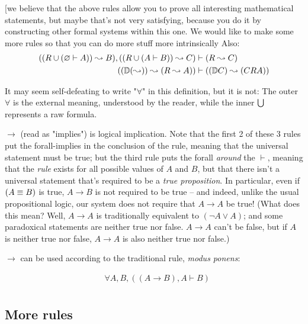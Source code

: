 \documentclass{article}
\begin{document}
  
  \iffalse
  
  [we believe that the above rules allow you to prove all interesting mathematical statements, but maybe that's not very satisfying, because you do it by constructing other formal systems within this one. We would like to make some more rules so that you can do more stuff more intrinsically
  Also:
  \begin{align*}
    ((R \cup (\varnothing \vdash A)) \leadsto B), ((R \cup (A \vdash B)) \leadsto C) &\vdash (R \leadsto C) \\
    ((\mathbb{D} (\leadsto)) \leadsto (R \leadsto A)) &\vdash ((\mathbb{D} C) \leadsto (C R A)) \\
  \end{align*}
  

  It may seem self-defeating to write "$\forall$" in this definition, but it is not: The outer $\forall$ is the external meaning, understood by the reader, while the inner $\bigcup$ represents a raw formula.
  
  
    
  $\to$ (read as "implies") is logical implication. Note that the first 2 of these 3 rules put the forall-implies in the conclusion of the rule, meaning that the universal statement must be true; but the third rule puts the forall \emph{around} the $\vdash$, meaning that the \emph{rule} exists for all possible values of $A$ and $B$, but that there isn't a universal statement that's required to be a \emph{true proposition}. In particular, even if $(A \equiv B)$ is true, $A \to B$ is not required to be true – and indeed, unlike the usual propositional logic, our system does not require that $A \to A$ be true! (What does this mean? Well, $A \to A$ is traditionally equivalent to $(\neg A \vee A)$; and some paradoxical statements are neither true nor false. $A \to A$ can't be false, but if $A$ is neither true nor false, $A \to A$ is also neither true nor false.)
  
  $\to$ can be used according to the traditional rule, \emph{modus ponens}:
  
  \begin{align*}
    &\forall A,B, ((A \to B), A \vdash B)\\
  \end{align*}
  
    
  \subsection{More rules}
  
\end{document}
